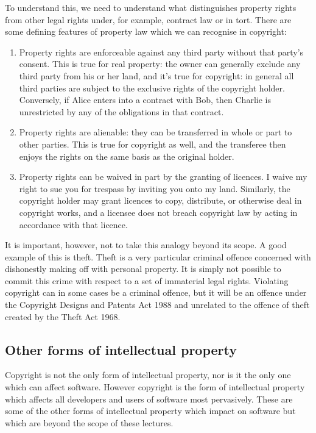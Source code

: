 \documentclass[a4paper,12pt]{article}
\begin{document}
To understand this, we need to understand what distinguishes property rights
from other legal rights under, for example, contract law or in tort. There
are some defining features of property law which we can recognise in
copyright:
\begin{enumerate}
\item Property rights are enforceable against any third party without that
  party's consent. This is true
  for real property: the owner can generally exclude any third party from
  his or her land, and it's true for copyright: in general all third parties
  are subject to the exclusive rights of the copyright holder. Conversely,
  if Alice enters into a contract with Bob, then Charlie is unrestricted by
  any of the obligations in that contract.
\item Property rights are alienable: they can be transferred in whole or
  part to other parties. This is true for copyright as well, and the
  transferee then enjoys the rights on the same basis as the original
  holder.
\item Property rights can be waived in part by the granting of licences. I
  waive my right to sue you for trespass by inviting you onto my
  land. Similarly, the copyright holder may grant licences to copy,
  distribute, or otherwise deal in copyright works, and a licensee does not
  breach copyright law by acting in accordance with that licence.
\end{enumerate}

It is important, however, not to take this analogy beyond its scope. A good
example of this is theft. Theft is a very particular criminal offence
concerned with dishonestly making off with personal property. It is simply
not possible to commit this crime with respect to a set of immaterial legal
rights. Violating copyright can in some cases be a criminal offence, but it
will be an offence under the Copyright Designs and Patents Act 1988 and
unrelated to the offence of theft created by the Theft Act 1968. 

\subsection{Other forms of intellectual property}

Copyright is not the only form of intellectual property, nor is it the only
one which can affect software. However copyright is the form of intellectual
property which affects all developers and users of software most
pervasively. These are some of the other forms of intellectual property
which impact on software but which are beyond the scope of these lectures.
\end{document}
